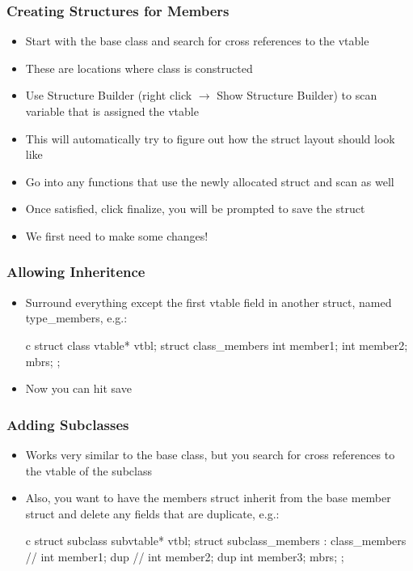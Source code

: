 \documentclass[aspectratio=169]{beamer}
\begin{document}
\begin{frame}
    \frametitle{Creating Structures for Members}

\begin{itemize}
    \item Start with the base class and search for cross references to the vtable
    \item These are locations where class is constructed
    \item Use Structure Builder (right click $\to$ Show Structure Builder) to scan variable that is assigned the vtable
    \item This will automatically try to figure out how the struct layout should look like
    \item Go into any functions that use the newly allocated struct and scan as well
    \item Once satisfied, click finalize, you will be prompted to save the struct
    \item We first need to make some changes!
\end{itemize}
\end{frame}

\begin{frame}[fragile]
    \frametitle{Allowing Inheritence}
\begin{itemize}
    \item Surround everything except the first vtable field in another struct, named type\_members, e.g.:
\begin{codebox}{c}
struct class {
    vtable* vtbl;
    struct class_members {
        int member1;
        int member2;
    } mbrs;
};
\end{codebox}
    \item Now you can hit save
\end{itemize}
\end{frame}

\begin{frame}[fragile]
    \frametitle{Adding Subclasses}
\begin{itemize}
    \item Works very similar to the base class, but you search for cross references to the vtable of the subclass
    \item Also, you want to have the members struct inherit from the base member struct and delete any fields that are duplicate, e.g.:
\begin{codebox}{c}
struct subclass {
    subvtable* vtbl;
    struct subclass_members : class_members {
        // int member1; dup
        // int member2; dup
        int member3;
    } mbrs;
};
\end{codebox}
\end{itemize}
\end{frame}
\end{document}
